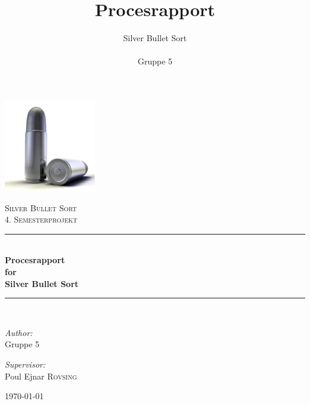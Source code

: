\documentclass[Main.tex]{subfiles}
\begin{document}
\newcommand{\HRule}{\rule{\linewidth}{0.8mm}}
\author{Silver Bullet Sort\\\\Gruppe 5}
\title{Procesrapport}
\date{}

\begin{titlepage}

\begin{center}


\includegraphics[width=0.30\textwidth]{./Billeder/0_1_ForsideBillede.jpg}    

\textsc{\LARGE Silver Bullet Sort}\\[1.5cm]

\textsc{\Large 4. Semesterprojekt}\\[0.5cm]


\HRule \\[0.4cm]

{ \huge \bfseries Procesrapport}\\[0.4cm]
{ \huge \bfseries for}\\[0.4cm] 
{ \huge \bfseries Silver Bullet Sort}\\[0.4cm]

\HRule \\[1.5cm]

\begin{minipage}{0.4\textwidth}
\begin{flushleft} \large
\emph{Author:}\\
Gruppe \textsc{5}
\end{flushleft}
\end{minipage}
\begin{minipage}{0.4\textwidth}
\begin{flushright} \large
\emph{Supervisor:} \\
Poul Ejnar \textsc{Rovsing}
\end{flushright}
\end{minipage}

\vfill

{\large \today}

\end{center}

\end{titlepage}
\end{document}
